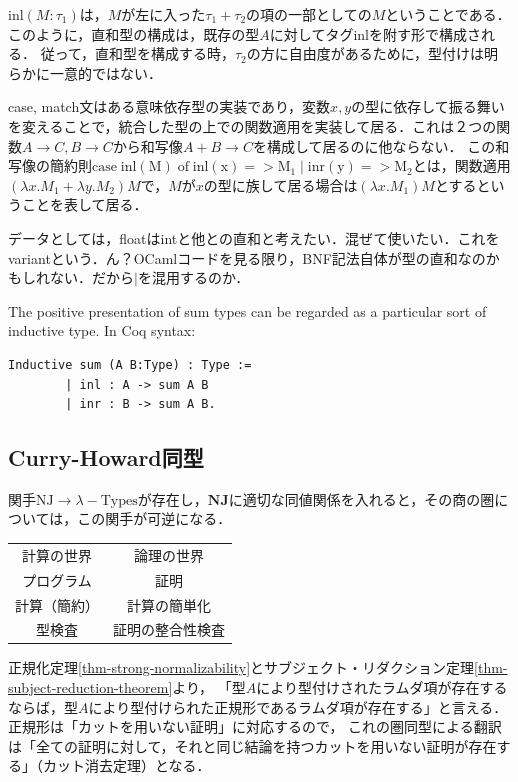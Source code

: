 \documentclass[uplatex, dvipdfmx]{jsreport}
\begin{document}
\begin{remark}[どうしてこんなに記法がわかりにくいんだ．]
    $\mathrm{inl}(M:\tau_1)$は，$M$が左に入った$\tau_1+\tau_2$の項の一部としての$M$ということである．
    このように，直和型の構成は，既存の型$A$に対してタグinlを附す形で構成される．
    従って，直和型を構成する時，$\tau_2$の方に自由度があるために，型付けは明らかに一意的ではない．
    
    case, match文はある意味依存型の実装であり，変数$x,y$の型に依存して振る舞いを変えることで，統合した型の上での関数適用を実装して居る．これは２つの関数$A\to C,B\to C$から和写像$A+B\to C$を構成して居るのに他ならない．
    この和写像の簡約則$\mathrm{case\;inl(M)\;of\;inl(x)=>M_1\mid inr(y)=>M_2}$とは，関数適用$\left(\lambda x.M_1+\lambda y.M_2\right)M$で，$M$が$x$の型に族して居る場合は$(\lambda x.M_1)M$とするということを表して居る．

    データとしては，floatはintと他との直和と考えたい．混ぜて使いたい．これをvariantという．ん？OCamlコードを見る限り，BNF記法自体が型の直和なのかもしれない．だから$\mid$を混用するのか．
\end{remark}
\begin{example}
    The positive presentation of sum types can be regarded as a particular sort of inductive type. In Coq syntax:
    \begin{lstlisting}[caption=Coq]
        Inductive sum (A B:Type) : Type :=
        | inl : A -> sum A B
        | inr : B -> sum A B.
    \end{lstlisting}
\end{example}

\subsection{Curry-Howard同型}
関手$\mathrm{NJ}\to \lambda-\mathrm{Types}$が存在し，$\mathbf{NJ}$に適切な同値関係を入れると，その商の圏については，この関手が可逆になる．

\begin{table}[h]\centering
    \begin{tabular}{c|c}
        計算の世界 & 論理の世界\\
        プログラム & 証明\\
        計算（簡約） & 計算の簡単化\\
        型検査 & 証明の整合性検査
    \end{tabular}
\end{table}

正規化定理\ref{thm-strong-normalizability}とサブジェクト・リダクション定理\ref{thm-subject-reduction-theorem}より，
「型$A$により型付けされたラムダ項が存在するならば，型$A$により型付けられた正規形であるラムダ項が存在する」と言える．正規形は「カットを用いない証明」に対応するので，
これの圏同型による翻訳は「全ての証明に対して，それと同じ結論を持つカットを用いない証明が存在する」（カット消去定理）となる．
\end{document}
